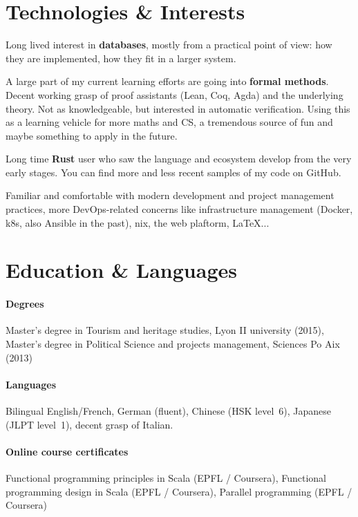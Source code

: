 \documentclass[10pt]{article}
\newcommand{\setparskip}{\setlength{\parskip}{.3em}}
\begin{document}
\hfill
\begin{minipage}[t]{0.42\textwidth}
  \setparskip
  \section*{Technologies \& Interests}

  Long lived interest in \textbf{databases}, mostly from a practical point of
  view: how they are implemented, how they fit in a larger system.

  A large part of my current learning efforts are going into \textbf{formal
    methods}. Decent working grasp of proof assistants (Lean, Coq, Agda) and the
  underlying theory.  Not as knowledgeable, but interested in automatic
  verification. Using this as a learning vehicle for more maths and CS, a
  tremendous source of fun and maybe something to apply in the future.

  Long time \textbf{Rust} user who saw the language and ecosystem develop
  from the very early stages. You can find more and less recent samples of my
  code on GitHub.

  Familiar and comfortable with modern development and project management
  practices, more DevOps-related concerns like infrastructure management
  (Docker, k8s, also Ansible in the past), nix, the web plaftorm, \LaTeX...

  \section*{Education \& Languages}

  \paragraph{Degrees} Master's degree in Tourism and heritage studies, Lyon II university (2015), Master's degree in Political Science and projects management, Sciences Po Aix (2013)

  \vspace{-1em}

  \paragraph{Languages} Bilingual English/French, German (fluent), Chinese (HSK level~6), Japanese (JLPT level~1), decent grasp of Italian.

  \vspace{-1em}

  \paragraph{Online course certificates} Functional programming principles in Scala (EPFL / Coursera), Functional programming design in Scala (EPFL / Coursera), Parallel programming (EPFL / Coursera)

\end{minipage}
\end{document}
